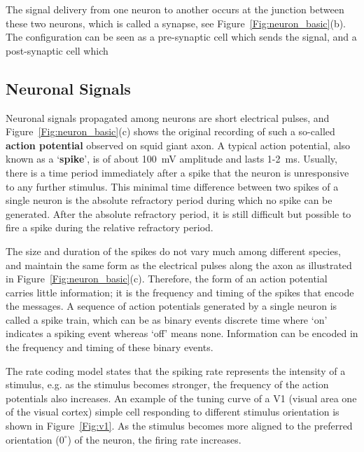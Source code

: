 The signal delivery from one neuron to another occurs at the junction between these two neurons, which is called a synapse, see Figure~\ref{Fig:neuron_basic}(b).
The configuration can be seen as a pre-synaptic cell which sends the signal, and a post-synaptic cell which \protect{} \protect{}



\subsection{Neuronal Signals}
Neuronal signals propagated among neurons are short electrical pulses, and Figure~\ref{Fig:neuron_basic}(c) shows the original recording of such a so-called \textbf{action potential} observed on \protect{} \protect{} squid giant axon.
A typical action potential, also known as a `\textbf{spike}', is of about 100~mV amplitude and lasts 1-2~ms.
Usually, there is a time period immediately after a spike that the neuron is unresponsive to any further stimulus.
This minimal time difference between two spikes of a single neuron is the absolute refractory period during which no spike can be generated.
After the absolute refractory period, it is still difficult but possible to 
fire a spike during the relative refractory period.

The size and duration of the spikes do not vary much among different species, and maintain the same form as the electrical pulses \protect{} \protect{} along the axon as illustrated in Figure~\ref{Fig:neuron_basic}(c).
Therefore, the form of an action potential carries little information;
it is the frequency and timing of the spikes that encode the messages.
A sequence of action potentials generated by a single neuron is called a spike train, which can be \protect{} \protect{} as binary events \protect{} \protect{} discrete time where `on' indicates a spiking event \protect{} whereas `off' means none.
Information can be encoded in the frequency and timing of these binary events.


The rate coding model states that the spiking rate represents the intensity of a stimulus, e.g. as the stimulus becomes stronger, the frequency of the action potentials also increases.
An example of the tuning curve of a V1 (visual area one of the visual cortex) simple cell responding to different stimulus orientation is shown in Figure~\ref{Fig:v1}.
As the stimulus becomes more aligned to the preferred orientation ($0^\circ$) of the neuron, the firing rate increases.

